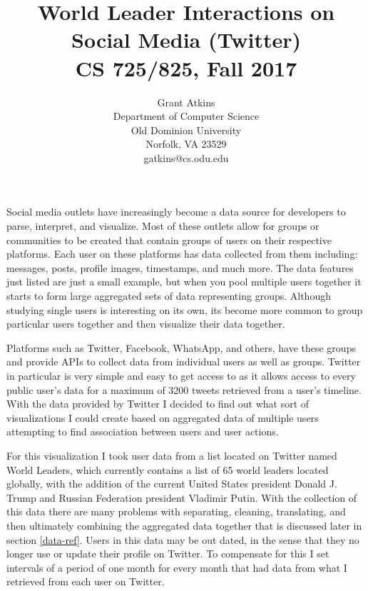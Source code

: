 \documentclass[journal]{vgtc}                %
\title{World Leader Interactions on Social Media (Twitter) \\
CS 725/825, Fall 2017}
\author{Grant Atkins\\
Department of Computer Science\\
Old Dominion University\\
Norfolk, VA 23529\\
gatkins@cs.odu.edu
}
\begin{document}


\maketitle

Social media outlets have increasingly become a data source for developers to parse, interpret, and visualize.
Most of these outlets allow for groups or communities to be created that contain groups of users on their respective platforms.
Each user on these platforms has data collected from them including: messages, posts, profile images, timestamps, and much more.
The data features just listed are just a small example, but when you pool multiple users together it starts to form large aggregated sets of data representing groups.
Although studying single users is interesting on its own, its become more common to group particular users together and then visualize their data together.

Platforms such as Twitter, Facebook, WhatsApp, and others, have these groups and provide APIs to collect data from individual users as well as groups.
Twitter in particular is very simple and easy to get access to as it allows access to every public user's data for a maximum of 3200 tweets retrieved from a user's timeline.
With the data provided by Twitter I decided to find out what sort of visualizations I could create based on aggregated data of multiple users attempting to find association between users and user actions.

For this visualization I took user data from a list located on Twitter named World Leaders, which currently contains a list of 65 world leaders located globally, with the addition of the current United States president Donald J. Trump and Russian Federation president Vladimir Putin.
With the collection of this data there are many problems with separating, cleaning, translating, and then ultimately combining the aggregated data together that is discussed later in section \ref{data-ref}.
Users in this data may be out dated, in the sense that they no longer use or update their profile on Twitter.
To compensate for this I set intervals of a period of one month for every month that had data from what I retrieved from each user on Twitter.
\end{document}
